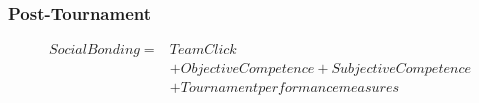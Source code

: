        \subsubsection{Post-Tournament\label{app8:MLM2a}}


            \begin{align*}
              Social Bonding   =& Team Click\\
                              &+ Objective Competence + Subjective Competence  \\
                              &+ Tournament performance measures \\
            \end{align*}

          \bigskip

        

